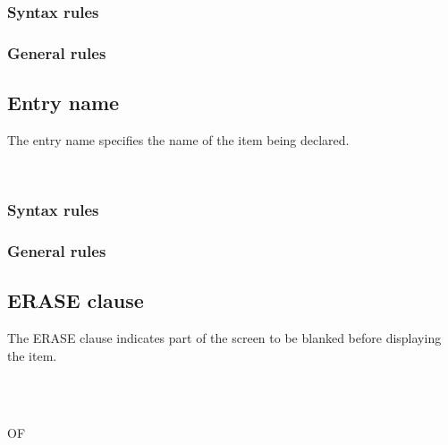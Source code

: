 \subsubsection{Syntax rules}

\subsubsection{General rules}

\subsection{Entry name}

The entry name specifies the name of the item being declared.

\begin{syntax}
  \begin{0-1}
     \\
    \identifier
  \end{0-1}
\end{syntax}

\subsubsection{Syntax rules}

\subsubsection{General rules}


\subsection{ERASE clause}

The ERASE clause indicates part of the screen to be blanked before displaying the item.

\begin{syntax}
  \begin{1=}
     \\
     \\

    \begin{0-1}
        OF
    \end{0-1}
    \begin{1=}
       \\
    \end{1=}
  \end{1=}
\end{syntax}

